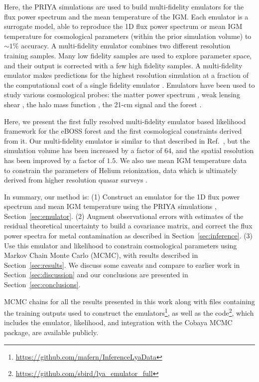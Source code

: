 Here, the PRIYA simulations are used to build multi-fidelity emulators \cite{2019JCAP...02..050B, 2022MNRAS.509.2551H, 2022MNRAS.517.3200F} for the flux power spectrum and the mean temperature of the IGM.
Each emulator is a surrogate model, able to reproduce the 1D flux power spectrum or mean IGM temperature for cosmological parameters (within the prior simulation volume) to $\sim 1 \%$ accuracy.
A multi-fidelity emulator combines two different resolution training samples.
Many low fidelity samples are used to explore parameter space, and their output is corrected with a few high fidelity samples.
A multi-fidelity emulator makes predictions for the highest resolution simulation at a fraction of the computational cost of a single fidelity emulator \cite{10.1093/biomet/87.1.1, 2022MNRAS.509.2551H}.
Emulators have been used to study various cosmological probes: the matter power spectrum \citep{Heitmann:2009, Heitmann:2014, Lawrence:2017, Giblin:2019, Euclid:2021, Arico:2021, Giri:2021}, weak lensing shear \citep{Harnois:2019, Davies:2021}, the halo mass function \citep{McClintock:2019, Nishimichi:2019, Bocquet:2022}, the 21-cm signal \citep{Kern:2017, Cohen:2020, Bevins:2021, Bye:2022} and the \lya forest \citep{2019JCAP...02..050B, Rogers:2019, 2021JCAP...05..033P, 2021JCAP...04..059W, Rogers:2021a,2021PhRvL.126g1302R}.

Here, we present the first fully resolved multi-fidelity emulator based likelihood framework for the eBOSS \lya forest and the first cosmological constraints derived from it.
Our multi-fidelity emulator is similar to that described in Ref.~\cite{2022MNRAS.517.3200F}, but the simulation volume has been increased by a factor of $64$, and the spatial resolution has been improved by a factor of $1.5$.
We also use mean IGM temperature data \cite{2021MNRAS.506.4389G} to constrain the parameters of Helium reionization, data which is ultimately derived from higher resolution quasar surveys \citep{2017MNRAS.466.4332I, 2022MNRAS.509.2842K, 2019MNRAS.489.2536D}.

In summary, our method is: (1) Construct an emulator for the 1D \lya flux power spectrum and mean IGM temperature using the PRIYA simulations \cite{2023simsuite}, Section~\ref{sec:emulator}.
(2) Augment observational errors with estimates of the residual theoretical uncertainty to build a covariance matrix, and correct the flux power spectra for metal contamination as described in Section~\ref{sec:inference}.
(3) Use this emulator and likelihood to constrain cosmological parameters using Markov Chain Monte Carlo (MCMC), with results described in Section~\ref{sec:results}.
We discuss some caveats and compare to earlier work in Section~\ref{sec:discussion} and our conclusions are presented in Section~\ref{sec:conclusions}.

MCMC chains for all the results presented in this work along with files containing the training outputs used to construct the emulators\footnote{\url{https://github.com/mafern/InferenceLyaData}}, as well as the code\footnote{\url{https://github.com/sbird/lya_emulator_full}}, which includes the emulator, likelihood, and integration with the Cobaya MCMC package, are available publicly.
